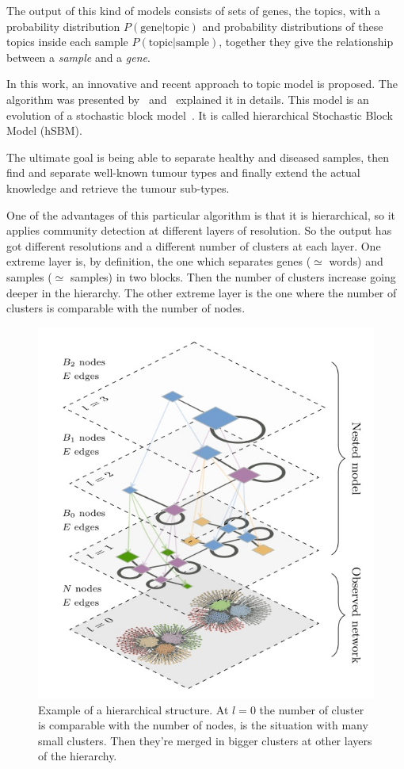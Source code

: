 The output of this kind of models consists of sets of genes, the topics, with a probability distribution $P(\text{gene} | \text{topic})$ and probability distributions of these topics inside each sample $P(\text{topic} | \text{sample})$, together they give the relationship between a \textit{sample} and a \textit{gene}.

In this work, an innovative and recent approach to topic model is proposed. The algorithm was presented by~\cite{gerlach2018network} and~\cite{Peixoto2017} explained it in details. This model is an evolution of a stochastic block model~\cite{Holland1983}. It is called hierarchical Stochastic Block Model (hSBM).

The ultimate goal is being able to separate healthy and diseased samples, then find and separate well-known tumour types and finally extend the actual knowledge and retrieve the tumour sub-types.

One of the advantages of this particular algorithm is that it is hierarchical, so it applies community detection at different layers of resolution. So the output has got different resolutions and a different number of clusters at each layer. One extreme layer is, by definition, the one which separates genes ($\simeq$ words) and samples ($\simeq$ samples) in two blocks. Then the number of clusters increase going deeper in the hierarchy. The other extreme layer is the one where the number of clusters is comparable with the number of nodes.
\begin{figure}[htb!]
  \centering
  \includegraphics[width=0.6\linewidth]{pictures/topic/peixioto_hierarchic.jpg}
  \caption{Example of a hierarchical structure. At $l=0$ the number of cluster is comparable with the number of nodes, is the situation with many small clusters. Then they're merged in bigger clusters at other layers of the hierarchy.}
  \label{fig:topic_peixioto_hierarchic}
\end{figure}

